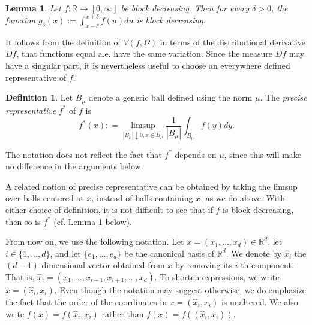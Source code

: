 \documentclass[12pt]{amsart}
\numberwithin{equation}{section}
\theoremstyle{plain}
\newtheorem{lemma}[theorem]{Lemma}
\theoremstyle{definition}
\newtheorem{definition}[theorem]{Definition}
\theoremstyle{remark}
\begin{document}
\begin{lemma}\label{bdl1}
  Let $f: \mathbb{R} \to [0,\infty]$ be  block decreasing.
Then for every $\delta >0$, the function
 $g_\delta(x):=\int_{x-\delta}^{x+\delta}f(u)du$ is block decreasing.
\end{lemma}

It follows from the definition of $V(f,\Omega)$ in terms of the distributional derivative
$Df$,  that functions equal a.e. have the same variation.
Since the measure $Df$ may have a singular part, it is
nevertheless
 useful to choose an everywhere defined representative of $f$.

\begin{definition}\label{precrep} Let $B_\mu$ denote a generic
 ball defined using the norm $\mu$. The {\em precise
representative} $f^*$ of $f$ is
\begin{equation*}
    f^*(x): =\limsup_{|B_\mu|\downarrow
    0, x\in B_\mu}\frac{1}{|B_\mu|}\int_{B_\mu}f(y)dy.
\end{equation*}
\end{definition}

The notation does not reflect the fact that $f^*$ depends on $\mu$,
since  this will make no difference in the arguments below.

A related notion of precise representative can be obtained
by taking the limsup over balls centered at $x$, instead of
balls containing $x$, as we do above.
With either choice of definition, it is not difficult to see that if $f$ is block decreasing, then so is $f^*$ (cf. Lemma \ref{precrep} below).

From now on, we  use the following notation. Let
$x=(x_1,\ldots,x_d)\in \mathbb{R}^d$,  let $i\in\{1,\ldots,d\}$,
and let $\{e_1,\ldots,e_d\}$ be the canonical basis of $\mathbb{R}^d$. We
denote by $\hat{x}_i$ the $(d-1)$-dimensional vector obtained from $x$
by removing its $i$-th component. That is,
$\hat{x}_{i}=(x_1,\ldots,x_{i-1},x_{i+1},\ldots,x_d)$. To shorten
expressions, we write $x=(\hat{x}_i,x_i)$. Even though the notation may suggest
otherwise, we do emphasize the fact that the
order of the coordinates in $x=(\hat{x}_i,x_i)$ is unaltered. We also write
$f(x) = f(\hat{x}_i,x_i)$ rather than $f(x) = f((\hat{x}_i,x_i))$.
\end{document}
